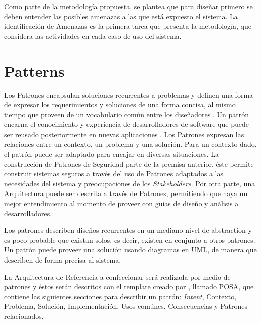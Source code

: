 Como parte de la metodología propuesta, se plantea que para diseñar primero se deben entender las posibles amenazas a las que está expuesto el sistema. La identificación de Amenazas \cite{braz2008eliciting,fernandez2006defining} es la primera tarea que presenta la metodología, que considera las actividades en cada caso de uso del sistema.


\section{Patterns}
\label{chap2:Patt}
Los Patrones encapsulan soluciones recurrentes a problemas y definen una forma de expresar los requerimientos y soluciones de una forma concisa, al mismo tiempo que proveen de un vocabulario común entre los diseñadores \cite{buschman1996system}. Un patrón encarna el conocimiento y experiencia de desarrolladores de software que puede ser reusado posteriormente en nuevas aplicaciones \cite{fernandez2004methodology, fernandez2013security}. Los Patrones expresan las relaciones entre un contexto, un problema y una solución. Para un contexto dado, el patrón puede ser adaptado para encajar en diversas situaciones. La construcción de Patrones de Seguridad parte de la premisa anterior, éste permite construir sistemas seguros a través del uso de Patrones adaptados a las necesidades del sistema y preocupaciones de los \textit{Stakeholders}. Por otra parte, una Arquitectura puede ser descrita a través de Patrones, permitiendo que haya un mejor entendimiento al momento de proveer con guías de diseño y análisis a desarrolladores.

Los patrones describen diseños recurrentes en un mediano nivel de abstraction y es poco probable que existan solos, es decir, existen en conjunto a otros patrones. Un patrón puede proveer una solución usando diagramas en UML, de manera que describen de forma precisa al sistema.

La Arquitectura de Referencia a confeccionar será realizada por medio de patrones y éstos serán descritos con el template creado por \cite{buschman1996system}, llamado POSA, que contiene las siguientes secciones para describir un patrón: \textit{Intent}, Contexto, Problema, Solución, Implementación, Usos comúnes, Consecuencias y Patrones relacionados.




